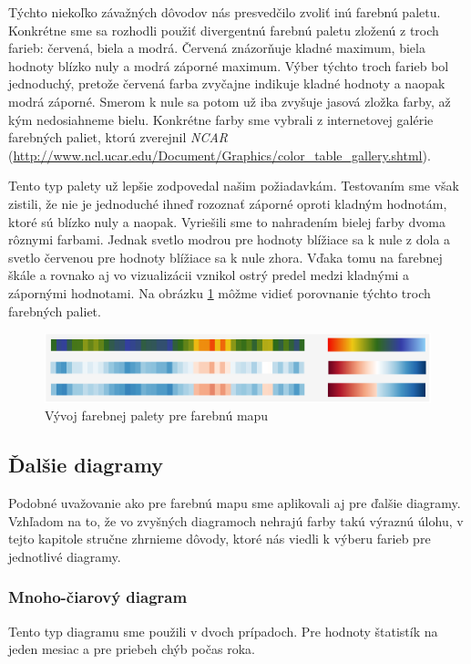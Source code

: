 Týchto niekoľko závažných dôvodov nás presvedčilo zvoliť inú farebnú paletu. Konkrétne sme sa rozhodli použiť divergentnú farebnú paletu zloženú z troch farieb: červená, biela a modrá. Červená znázorňuje kladné maximum, biela hodnoty blízko nuly a modrá záporné maximum. Výber týchto troch farieb bol jednoduchý, pretože červená farba zvyčajne indikuje kladné hodnoty a naopak modrá záporné. Smerom k nule sa potom už iba zvyšuje jasová zložka farby, až kým nedosiahneme bielu. Konkrétne farby sme vybrali z internetovej galérie farebných paliet, ktorú zverejnil \textit{NCAR} (\url{http://www.ncl.ucar.edu/Document/Graphics/color_table_gallery.shtml}).

Tento typ palety už lepšie zodpovedal našim požiadavkám. Testovaním sme však zistili, že nie je jednoduché ihneď rozoznať záporné oproti kladným hodnotám, ktoré sú blízko nuly a naopak. Vyriešili sme to nahradením bielej farby dvoma rôznymi farbami. Jednak svetlo modrou pre hodnoty blížiace sa k nule z dola a svetlo červenou pre hodnoty blížiace sa k nule zhora. Vďaka tomu na farebnej škále a rovnako aj vo vizualizácii vznikol ostrý predel medzi kladnými a zápornými hodnotami. Na obrázku \ref{fig:colorpalettes} môžme vidieť porovnanie týchto troch farebných paliet.


\begin{figure}
	\centering
	\includegraphics[width = 5in]{colorpalettes}
	\caption{Vývoj farebnej palety pre farebnú mapu}
	\label{fig:colorpalettes}
\end{figure}


\subsection{Ďalšie diagramy}
Podobné uvažovanie ako pre farebnú mapu sme aplikovali aj pre ďalšie diagramy. Vzhľadom na to, že vo zvyšných diagramoch nehrajú farby takú výraznú úlohu, v tejto kapitole stručne zhrnieme dôvody, ktoré nás viedli k výberu farieb pre jednotlivé diagramy.

\subsubsection{Mnoho-čiarový diagram} 
Tento typ diagramu sme použili v dvoch prípadoch. Pre hodnoty štatistík na jeden mesiac a pre priebeh chýb počas roka.

